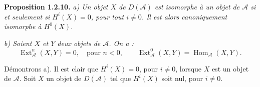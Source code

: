 \medskip\noindent\textbf{Proposition 1.2.10.}\quad
\textit{a) Un objet $X$ de $D(\mathcal A)$ est isomorphe à un objet de
$\mathcal A$ si et seulement si $H^i(X)=0$, pour tout $i\neq0$. Il est alors
canoniquement isomorphe à $H^0(X)$.}

\noindent\textit{b) Soient $X$ et $Y$ deux objets de $\mathcal A$. On a :}
\[
\operatorname{Ext}_{\mathcal A}^{n}(X,Y)=0,\quad\text{pour }n<0,
\qquad
\operatorname{Ext}_{\mathcal A}^{0}(X,Y)
=\operatorname{Hom}_{\mathcal A}(X,Y).
\]

Démontrons a). Il est clair que $H^i(X)=0$, pour $i\neq0$, lorsque $X$ est
un objet de $\mathcal A$. Soit $X$ un objet de $D(\mathcal A)$ tel que
$H^i(X)$ soit nul, pour $i\neq0$.
\endgroup
